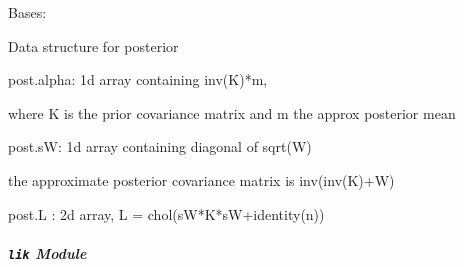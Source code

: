 \documentclass[letterpaper,10pt,english]{sphinxmanual}
\begin{document}

\begin{fulllineitems}
\label{pyGPs.Core:pyGPs.Core.inf.postStruct}
Bases: 

Data structure for posterior

\begin{DUlineblock}{0em}
\item[] post.alpha: 1d array containing inv(K)*m, 
\item[] where K is the prior covariance matrix and m the approx posterior mean
\item[] post.sW: 1d array containing diagonal of sqrt(W)
\item[] the approximate posterior covariance matrix is inv(inv(K)+W)
\item[] post.L : 2d array, L = chol(sW*K*sW+identity(n))
\end{DUlineblock}

\end{fulllineitems}



\subparagraph{\texttt{lik} Module}
\label{pyGPs.Core:module-pyGPs.Core.lik}\label{pyGPs.Core:lik-module}
\end{document}
